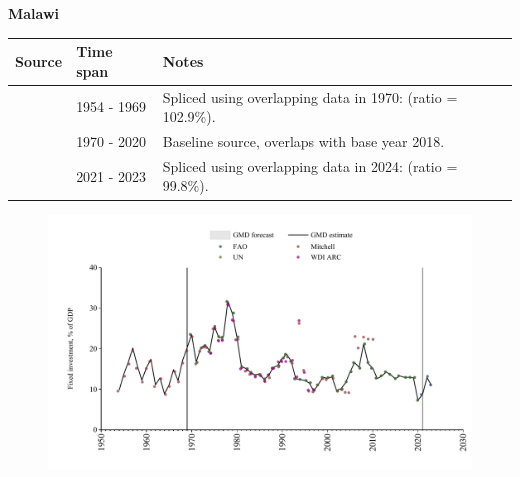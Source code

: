 \documentclass[12pt,a4paper,landscape]{article}
\begin{document}
\begin{adjustbox}{max totalsize={\paperwidth}{\paperheight},center}
\begin{minipage}[t][\textheight][t]{\textwidth}
\vspace*{0.5cm}
{}
\begin{center}
{\Large\bfseries Malawi}
\end{center}
\vspace{0.5cm}
\begin{table}[H]
\centering
\small
\begin{tabular}{|l|l|l|}
\hline
\textbf{Source} & \textbf{Time span} & \textbf{Notes} \\
\hline
\rowcolor{white}\cite{Mitchell}& 1954 - 1969 &Spliced using overlapping data in 1970: (ratio = 102.9\%).\\
\rowcolor{lightgray}\cite{UN}& 1970 - 2020 &Baseline source, overlaps with base year 2018.\\
\rowcolor{white}\cite{FAO}& 2021 - 2023 &Spliced using overlapping data in 2024: (ratio = 99.8\%).\\
\hline
\end{tabular}
\end{table}
\begin{figure}[H]
\centering
\includegraphics[width=\textwidth,height=0.6\textheight,keepaspectratio]{graphs/MWI_finv_GDP.pdf}
\end{figure}
\end{minipage}
\end{adjustbox}
\end{document}
